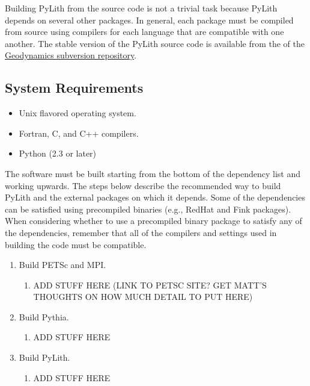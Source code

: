 Building PyLith from the source code is not a trivial task because
PyLith depends on several other packages. In general, each package
must be compiled from source using compilers for each language that
are compatible with one another. The stable version of the PyLith
source code is available from the
of the \href{http://www.geodynamics.org:8080/}{Geodynamics subversion
  repository}.

\subsection{System Requirements}

\begin{itemize}
\item Unix flavored operating system.
\item Fortran, C, and C++ compilers.
\item Python (2.3 or later)
\end{itemize}

The software must be built starting from the bottom of the dependency
list and working upwards. The steps below describe the recommended way
to build PyLith and the external packages on which it depends. Some of
the dependencies can be satisfied using precompiled binaries (e.g.,
RedHat and Fink packages). When considering whether to use a
precompiled binary package to satisfy any of the dependencies,
remember that all of the compilers and settings used in building the
code must be compatible.

\begin{enumerate}
\item Build PETSc and MPI.
  \begin{enumerate}
  \item ADD STUFF HERE (LINK TO PETSC SITE? GET MATT'S THOUGHTS ON HOW
    MUCH DETAIL TO PUT HERE)
  \end{enumerate}
\item Build Pythia.
  \begin{enumerate}
  \item ADD STUFF HERE
  \end{enumerate}
\item Build PyLith.
  \begin{enumerate}
  \item ADD STUFF HERE
  \end{enumerate}
\end{enumerate}

